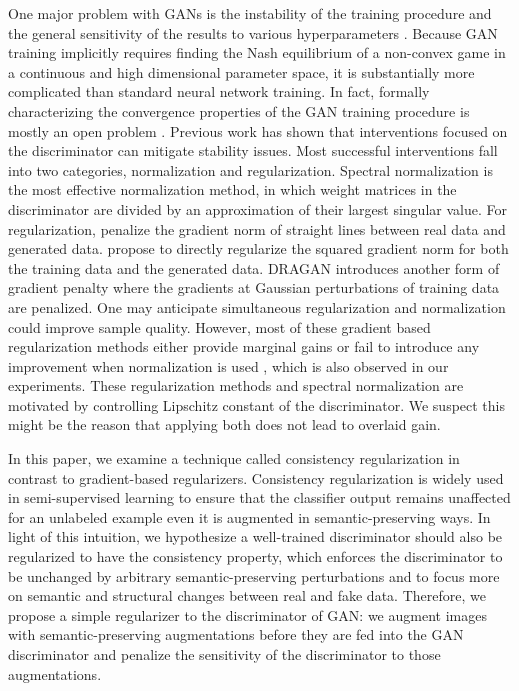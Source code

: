 \documentclass{article} \usepackage{iclr2020_conference,times}
\begin{document}
One major problem with GANs is the instability of the training procedure and the general sensitivity of the results to various hyperparameters \citep{salimans2016improved}.
Because GAN training implicitly requires finding the Nash equilibrium of a non-convex game in a continuous and high dimensional parameter space, it is 
substantially more complicated than standard neural network training.
In fact, formally characterizing the convergence properties of the GAN training procedure
is mostly an open problem \citep{OPENPROBLEMS}.
Previous work \citep{ArjovskyB17, Miyato18a,odena2017conditional,ChenZRLH19, WeiGL0W18} has shown that interventions focused on the discriminator can mitigate stability issues. 
Most successful interventions fall into two categories, normalization and regularization.
Spectral normalization is the most effective normalization method, in which weight matrices in the discriminator are divided by an approximation of their largest singular value.
For regularization, \citet{WGANGP} penalize the gradient norm of straight lines between real data and generated data.
\citet{RothLNH17} propose to directly regularize the squared gradient norm for both the training data and the generated data.
DRAGAN \citep{kodali2017convergence} introduces another form of gradient penalty where the gradients at Gaussian perturbations of training data are penalized. One may anticipate simultaneous regularization and normalization could improve sample quality.  
However, most of these gradient based regularization methods either provide marginal gains or fail to introduce any improvement when normalization is used \citep{compare_gan}, which is also observed in our experiments. These regularization methods and spectral normalization are motivated by controlling Lipschitz constant of the discriminator. We suspect this might be the reason that applying both does not lead to overlaid gain.

In this paper, we examine a technique called consistency regularization \citep{BachmanAP14, CONSISTENCY,laine2016temporal, CONSISTENCYAVITAL,UDACONSISTENCY, HuMTMS17} in contrast to gradient-based regularizers. Consistency regularization is widely used in semi-supervised learning to ensure that the classifier output remains unaffected for an unlabeled example even it is augmented in semantic-preserving ways. In light of this intuition, we hypothesize a well-trained discriminator should also be regularized to have the consistency property, which enforces the discriminator to be unchanged by arbitrary semantic-preserving perturbations and to focus more on semantic and structural changes between real and fake data. Therefore, we propose a simple regularizer to the discriminator of GAN: we augment images with semantic-preserving augmentations before they are fed into the GAN discriminator and penalize the sensitivity of the discriminator to those augmentations. 
\end{document}
